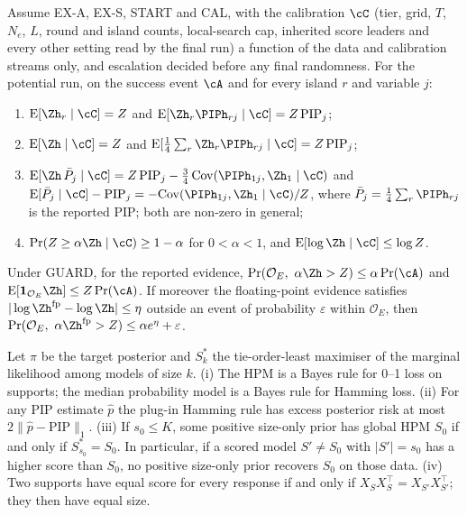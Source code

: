 \begin{proposition}\label{prop:frozen}
Assume EX-A, EX-S, START and CAL, with the calibration $\cC$ (tier, grid, $T$, $N_e$, $L$, round and island counts,
local-search cap, inherited score leaders and every other setting read by the final run) a function of the data and
calibration streams only, and escalation decided before any final randomness. For the potential run, on the success
event $\cA$ and for every island $r$ and variable $j$:
\begin{enumerate}
\item[(a)] $\mathrm E[\Zh_r\mid\cC]=Z$ and $\mathrm E[\Zh_r\PIPh_{rj}\mid\cC]=Z\,\mathrm{PIP}_j$;
\item[(b)] $\mathrm E[\Zh\mid\cC]=Z$ and $\mathrm E[\tfrac14\sum_r\Zh_r\PIPh_{rj}\mid\cC]=Z\,\mathrm{PIP}_j$;
\item[(c)] $\mathrm E[\Zh\,\bar P_j\mid\cC]=Z\,\mathrm{PIP}_j-\tfrac34\,\mathrm{Cov}(\PIPh_{1j},\Zh_1\mid\cC)$ and
  $\mathrm E[\bar P_j\mid\cC]-\mathrm{PIP}_j=-\mathrm{Cov}(\PIPh_{1j},\Zh_1\mid\cC)/Z$, where
  $\bar P_j=\tfrac14\sum_r\PIPh_{rj}$ is the reported PIP; both are non-zero in general;
\item[(d)] $\Pr(Z\ge\alpha\Zh\mid\cC)\ge1-\alpha$ for $0<\alpha<1$, and $\mathrm E[\log\Zh\mid\cC]\le\log Z$.
\end{enumerate}
Under GUARD, for the reported evidence,
$\Pr(\mathcal O_E,\ \alpha\Zh>Z)\le\alpha\Pr(\cA)$ and $\mathrm E[\mathbf 1_{\mathcal O_E}\Zh]\le Z\Pr(\cA)$.
If moreover the floating-point evidence satisfies $|\log\Zh^{\rm fp}-\log\Zh|\le\eta$ outside an event of
probability $\varepsilon$ within $\mathcal O_E$, then $\Pr(\mathcal O_E,\ \alpha\Zh^{\rm fp}>Z)\le\alpha e^{\eta}+\varepsilon$.
\end{proposition}

\begin{proposition}\label{prop:decision}
Let $\pi$ be the target posterior and $S^*_k$ the tie-order-least maximiser of the marginal likelihood among models
of size $k$.
(i) The HPM is a Bayes rule for 0--1 loss on supports; the median probability model is a Bayes rule for Hamming loss.
(ii) For any PIP estimate $\hat p$ the plug-in Hamming rule has excess posterior risk at most $2\|\hat p-\mathrm{PIP}\|_1$.
(iii) If $s_0\le K$, some positive size-only prior has global HPM $S_0$ if and only if $S^*_{s_0}=S_0$.
In particular, if a scored model $S'\ne S_0$ with $|S'|=s_0$ has a higher score than $S_0$, no positive size-only prior
recovers $S_0$ on those data.
(iv) Two supports have equal score for every response if and only if $X_SX_S^\top=X_{S'}X_{S'}^\top$; they then have
equal size.
\end{proposition}


